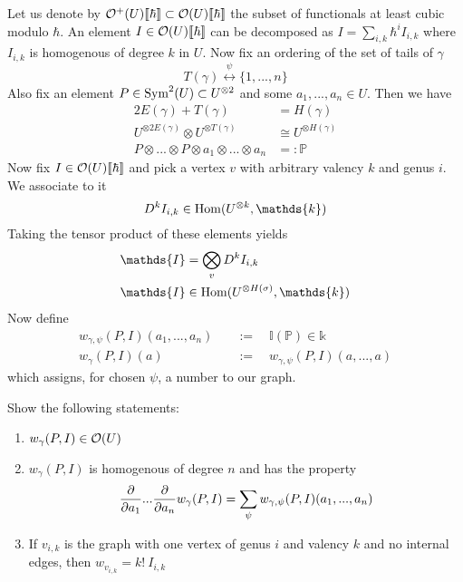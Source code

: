 \begin{definition}
  Let us denote by $\mathcal{O}^+(U) \llbracket \hbar \rrbracket \subset \mathcal{O}(U) \llbracket \hbar \rrbracket$ the subset of functionals at least cubic modulo $\hbar$. An element $I \in \mathcal{O}(U) \llbracket \hbar \rrbracket$ can be decomposed as $I = \sum_{i,k} \hbar^i I_{i,k}$ where $I_{i,k}$ is homogenous of degree $k$ in $U$. Now fix an ordering of the set of tails of $\gamma$
  $$ T(\gamma) \overset{\psi}{\longleftrightarrow} \{1, ..., n\}$$
  Also fix an element $P \in \operatorname{Sym}^2(U) \subset U^{\otimes 2}$ and some $a_1, ..., a_n \in U$. Then we have
  \begin{align*}
    2 E(\gamma) + T(\gamma) &= H(\gamma) \\
    U^{\otimes 2 E(\gamma)} \otimes U^{\otimes T(\gamma)} &\cong U^{\otimes H(\gamma)} \\
    P \otimes ... \otimes P \otimes a_1 \otimes ... \otimes a_n &=: \mathds{P}
  \end{align*}
  Now fix $I \in \mathcal{O}(U) \llbracket \hbar \rrbracket$ and pick a vertex $v$ with arbitrary valency $k$ and genus $i$. We associate to it
  $$ D^k I_{i,k} \in \Hom(U^{\otimes k}, \mathds{k}) $$
  Taking the tensor product of these elements yields
  \begin{align*}
    \mathds{I} &= \bigotimes_v D^k I_{i,k}\\
    \mathds{I} &\in \Hom(U^{\otimes H(\sigma)}, \mathds{k})
  \end{align*}
  Now define
  \begin{align*}
    w_{\gamma, \psi} (P,I) (a_1, ..., a_n) \quad &:= \quad \mathds{I}(\mathds{P}) \in \mathds{k} \\
    w_\gamma (P,I) (a) \quad &:= \quad w_{\gamma,\psi} (P,I)(a, ..., a)
  \end{align*}
  which assigns, for chosen $\psi$, a number to our graph.
\end{definition}

\begin{ex}
Show the following statements:
\begin{enumerate}
  \item $w_\gamma(P,I) \in \mathcal{O}(U)$

  \item $w_\gamma(P,I)$ is homogenous of degree $n$ and has the property
  $$ \frac{\partial }{\partial a_1} ... \frac{\partial }{\partial a_n} w_\gamma(P,I) = \sum_\psi w_{\gamma, \psi} (P,I) (a_1, ..., a_n) $$

  \item If $v_{i,k}$ is the graph with one vertex of genus $i$ and valency $k$ and no internal edges, then $w_{v_{i,k}} = k! \ I_{i,k}$
\end{enumerate}
\end{ex}

